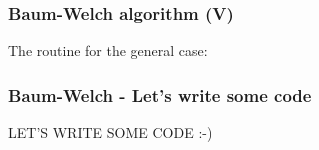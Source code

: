 \begin{frame}[fragile, t]
	\frametitle{Baum-Welch algorithm (V)}
	The routine for the general case:
	\vspace*{1em}

	
        

\end{frame}

\begin{frame}
	\frametitle{Baum-Welch - Let's write some code}
	\centering
	LET'S WRITE SOME CODE :-)
\end{frame}